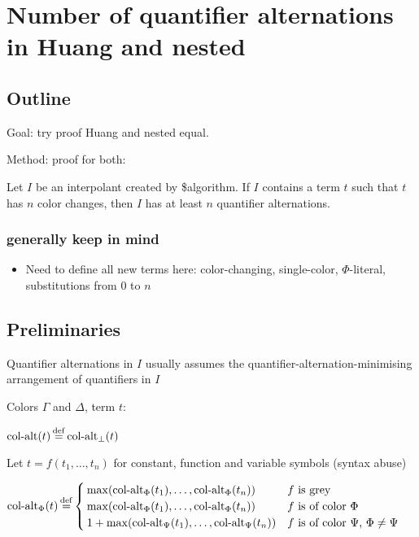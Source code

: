 \documentclass[,%
	draft=false,%
	numbers=noendperiod
	12pt,
	a4paper,
	oneside,%
	openany,
]{memoir}
\begin{document}
\chapter{ Number of quantifier alternations in Huang and nested }

\section{ Outline }

Goal: try proof Huang and nested equal.

Method: proof for both:

\begin{cprop}
	Let $I$ be an interpolant created by \$algorithm.
	If $I$ contains a term $t$ such that $t$ has $n$ color changes, then $I$ has at least $n$ quantifier alternations.
\end{cprop}

\subsection{generally keep in mind}

\begin{itemize}
	\item Need to define all new terms here: color-changing, single-color, $\Phi$-literal, substitutions from $0$ to $n$
\end{itemize}

\section{ Preliminaries }

Quantifier alternations in $I$ usually assumes the quantifier-alternation-minimising arrangement of quantifiers in $I$ 

\begin{defi}
	Colors $\Gamma$ and $\Delta$, term $t$:

	$\ca(t) \defeq \ca_\bot(t)$

	Let $t = f(t_1, \dots, t_n)$ for constant, function and variable symbols (syntax abuse)

	
	$\ca_\Phi(t) \defeq 
	\begin{cases}
		\max(\ca_\Phi(t_1), \dots, \ca_\Phi(t_n)) & \text{$f$ is grey} \\
		\max(\ca_\Phi(t_1), \dots, \ca_\Phi(t_n)) & \text{$f$ is of color $\Phi$} \\
		1 + \max(\ca_\Psi(t_1), \dots, \ca_\Psi(t_n)) & \text{$f$ is of color $\Psi$, $\Phi \neq \Psi$} \\
	\end{cases}
	$
\end{defi}
\end{document}
